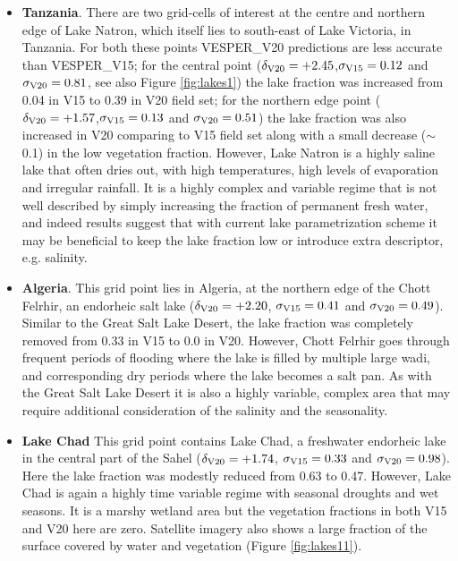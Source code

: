 \documentclass[hess, twostagejnl]{copernicus}
\begin{document}
\begin{itemize}
	\item \textbf{Tanzania}. There are two grid-cells of interest at the centre and northern edge of Lake Natron, which itself lies to south-east of Lake Victoria, in Tanzania. For both these points VESPER\_V20 predictions are less accurate than VESPER\_V15; for the central point ($\delta_{\rm V20} = +2.45$,$\sigma_{\rm V15} = 0.12$ and $\sigma_{\rm V20}=0.81$, see also Figure \ref{fig:lakes1}) the lake fraction was increased from 0.04 in V15 to 0.39 in V20 field set; for the northern edge point ($\delta_{\rm V20} = +1.57$,$\sigma_{\rm V15} = 0.13$ and $\sigma_{\rm V20}=0.51$) the lake fraction was also increased in V20 comparing to V15 field set along with a small decrease ($\sim$0.1) in the low vegetation fraction. However, Lake Natron is a highly saline lake that often dries out, with high temperatures, high levels of evaporation and irregular rainfall. It is a highly complex and variable regime that is not well described by simply increasing the fraction of permanent fresh water, and indeed results suggest that with current lake parametrization scheme it may be beneficial to keep the lake fraction low or introduce extra descriptor, e.g. salinity. 

	\item \textbf{Algeria}. This grid point lies in Algeria, at the northern edge of the Chott Felrhir, an endorheic salt lake ($\delta_{\rm V20} = +2.20$, $\sigma_{\rm V15} = 0.41$ and $\sigma_{\rm V20}=0.49$). Similar to the Great Salt Lake Desert, the lake fraction was completely removed from 0.33 in V15 to 0.0 in V20. However, Chott Felrhir goes through frequent periods of flooding where the lake is filled by multiple large wadi, and corresponding dry periods where the lake becomes a salt pan. As with the Great Salt Lake Desert it is also a highly variable, complex area that may require additional consideration of the salinity and the seasonality.  
	
	
	\item \textbf{Lake Chad} This grid point contains Lake Chad, a freshwater endorheic lake in the central part of the Sahel ($\delta_{\rm V20} = +1.74$, $\sigma_{\rm V15} = 0.33$ and $\sigma_{\rm V20}=0.98$). Here the lake fraction was modestly reduced from 0.63 to 0.47. However, Lake Chad is again a highly time variable regime with seasonal droughts and wet seasons. It is a marshy wetland area but the vegetation fractions in both V15 and V20 here are zero. Satellite imagery also shows a large fraction of the surface covered by water and vegetation (Figure \ref{fig:lakes11}).
	


\end{itemize}
\end{document}
